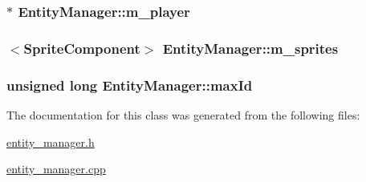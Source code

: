 \hypertarget{classEntityManager_ac966d9cc295a8222c01a835246206d36}{
\subsubsection[{m\-\_\-player}]{$\ast$ Entity\-Manager\-::m\-\_\-player\hspace{0.3cm}{\ttfamily [private]}}}\label{classEntityManager_ac966d9cc295a8222c01a835246206d36}
\hypertarget{classEntityManager_ab0ca6f699c4b0380acc8c0c2dd0fa778}{
\subsubsection[{m\-\_\-sprites}]{$<${\bf Sprite\-Component}$>$ Entity\-Manager\-::m\-\_\-sprites\hspace{0.3cm}{\ttfamily [private]}}}\label{classEntityManager_ab0ca6f699c4b0380acc8c0c2dd0fa778}
\hypertarget{classEntityManager_a73390a51b55cd69d0d09254894d484b3}{
\subsubsection[{max\-Id}]{\setlength{\rightskip}{0pt plus 5cm}unsigned long Entity\-Manager\-::max\-Id\hspace{0.3cm}{\ttfamily [private]}}}\label{classEntityManager_a73390a51b55cd69d0d09254894d484b3}


The documentation for this class was generated from the following files\-:\begin{DoxyCompactItemize}
\item 
\hyperlink{entity__manager_8h}{entity\-\_\-manager.\-h}\item 
\hyperlink{entity__manager_8cpp}{entity\-\_\-manager.\-cpp}\end{DoxyCompactItemize}

